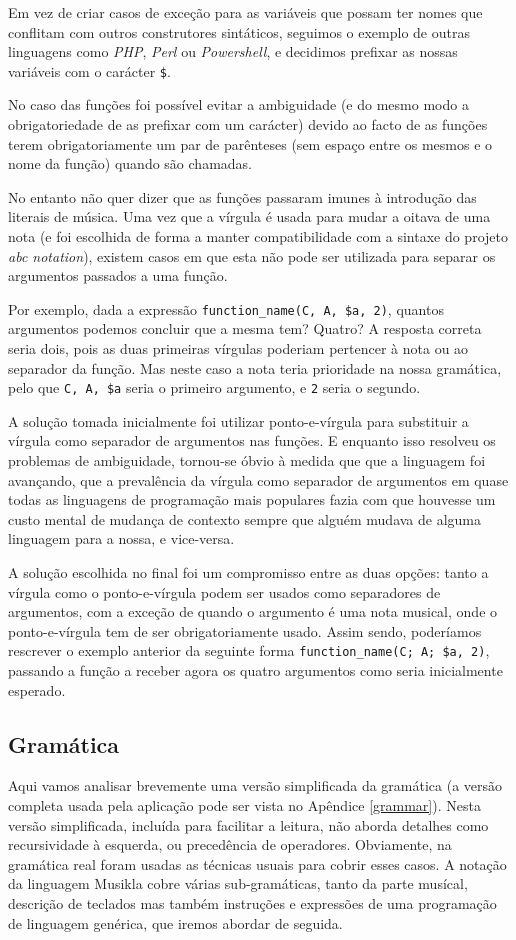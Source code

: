 Em vez de criar casos de exceção para as variáveis que possam ter nomes que conflitam com outros construtores sintáticos, seguimos o exemplo de outras linguagens como \textit{PHP}, \textit{Perl} ou \textit{Powershell}, e decidimos prefixar as nossas variáveis com o carácter \texttt{\$}.

No caso das funções foi possível evitar a ambiguidade (e do mesmo modo a obrigatoriedade de as prefixar com um carácter) devido ao facto de as funções terem obrigatoriamente um par de parênteses (sem espaço entre os mesmos e o nome da função) quando são chamadas.

No entanto não quer dizer que as funções passaram imunes à introdução das literais de música. Uma vez que a vírgula é usada para mudar a oitava de uma nota (e foi escolhida de forma a manter compatibilidade com a sintaxe do projeto \textit{abc notation}), existem casos em que esta não pode ser utilizada para separar os argumentos passados a uma função.

Por exemplo, dada a expressão \texttt{function\_name(C, A, \$a, 2)}, quantos argumentos podemos concluir que a mesma tem? Quatro? A resposta correta seria dois, pois as duas primeiras vírgulas poderiam pertencer à nota ou ao separador da função. Mas neste caso a nota teria prioridade na nossa gramática, pelo que \texttt{C, A, \$a} seria o primeiro argumento, e \texttt{2} seria o segundo.

A solução tomada inicialmente foi utilizar ponto-e-vírgula para substituir a vírgula como separador de argumentos nas funções. E enquanto isso resolveu os problemas de ambiguidade, tornou-se óbvio à medida que que a linguagem foi avançando, que a prevalência da vírgula como separador de argumentos em quase todas as linguagens de programação mais populares fazia com que houvesse um custo mental de mudança de contexto sempre que alguém mudava de alguma linguagem para a nossa, e vice-versa.

A solução escolhida no final foi um compromisso entre as duas opções: tanto a vírgula como o ponto-e-vírgula podem ser usados como separadores de argumentos, com a exceção de quando o argumento é uma nota musical, onde o ponto-e-vírgula tem de ser obrigatoriamente usado. Assim sendo, poderíamos rescrever o exemplo anterior da seguinte forma \texttt{function\_name(C; A; \$a, 2)}, passando a função a receber agora os quatro argumentos como seria inicialmente esperado.

\subsection{Gramática}
Aqui vamos analisar brevemente uma versão simplificada da gramática (a versão completa usada pela aplicação pode ser vista no Apêndice \ref{grammar}). Nesta versão simplificada, incluída para facilitar a leitura, não aborda detalhes como recursividade à esquerda, ou precedência de operadores. Obviamente, na gramática real foram usadas as técnicas usuais para cobrir esses casos.
A notação da linguagem Musikla cobre várias sub-gramáticas, tanto da parte musícal, descrição de teclados mas também instruções e expressões de uma programação de linguagem genérica, que iremos abordar de seguida.

